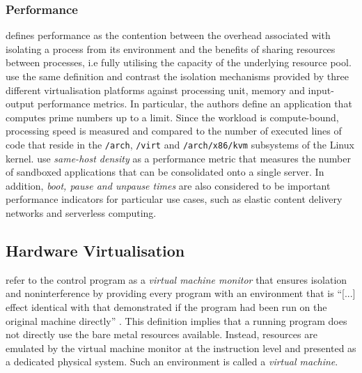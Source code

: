 \subsubsection{Performance}
\label{ch:fundamentals/virtualisation/axioms/performance}
\textcite{10.1145/3365199} defines performance as the contention between the overhead associated 
with isolating a process from its environment and the benefits of sharing resources between processes,
i.e fully utilising the capacity of the underlying resource pool. 
\textcite{10.1145/3381052.3381315} use the same definition and contrast the isolation mechanisms provided
by three different virtualisation platforms against processing unit, memory and input-output performance metrics. 
In particular, the authors define an application that computes prime numbers up to a limit. 
Since the workload is compute-bound, processing speed is measured and compared to the
number of executed lines of code that reside in the \verb|/arch|, \verb|/virt| and \verb|/arch/x86/kvm|
subsystems of the Linux kernel. \textcite{10.1145/3132747.3132763} use \textit{same-host density} as a 
performance metric that measures the number of sandboxed applications that can be consolidated onto a single server. 
In addition, \textit{boot, pause and unpause times} are also considered to be important performance indicators for particular 
use cases, such as elastic content delivery networks \cite{10.1145/3050748.3050757} \cite{10.1145/3132747.3132763}
and serverless computing.

\subsection{Hardware Virtualisation}
\label{ch:fundamentals/virtualisation/hardware-virtualisation}
\textcite{10.1145/361011.361073} refer to the control program as a \textit{virtual machine monitor} that 
ensures isolation and noninterference by providing every program with an environment that is \enquote{[...] effect
identical with that demonstrated if the program had been run on the original machine directly} 
\cite[2]{10.1145/361011.361073}. This definition implies that a running program does not directly use
the bare metal resources available. Instead, resources are emulated by the virtual machine monitor at
the instruction level and presented as a dedicated physical system. Such an environment is called 
a \textit{virtual machine}.

